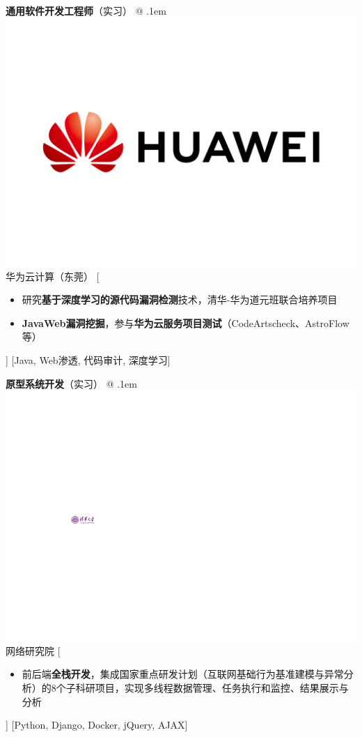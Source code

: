 \documentclass[zh]{resume}
\begin{document}
\vspace{-0.2cm}
\begin{experiences}
    {\textbf{通用软件开发工程师}（实习） @ \lower.1em\hbox{\includegraphics[scale=0.07]{photo/HuaweiLogo.pdf}} \textbullet 华为云计算（东莞）}%
    [\begin{itemize}
      \item 研究\textbf{基于深度学习的源代码漏洞检测}技术，清华-华为道元班联合培养项目
      \item \textbf{JavaWeb漏洞挖掘}，参与\textbf{华为云服务项目测试}（CodeArtscheck、AstroFlow等）
    \end{itemize}]
    [Java, Web渗透, 代码审计, 深度学习]

  \separator{0.5ex}
    {\textbf{原型系统开发}（实习） @ \lower.1em\hbox{\includegraphics[scale=0.6]{photo/Tsinghua.pdf}} \textbullet 网络研究院}%
    [\begin{itemize}
      \item 前后端\textbf{全栈开发}，集成国家重点研发计划（互联网基础行为基准建模与异常分析）的8个子科研项目，实现多线程数据管理、任务执行和监控、结果展示与分析
    \end{itemize}]
    [Python, Django, Docker, jQuery, AJAX]
    

\end{experiences}
\end{document}
